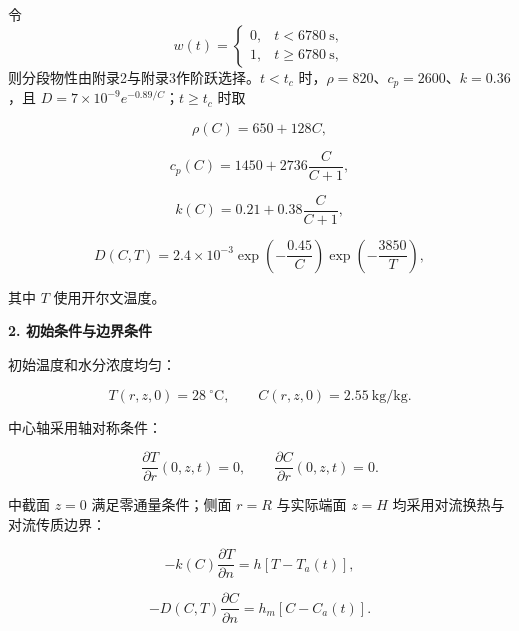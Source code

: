 \documentclass[12pt,a4paper]{ctexart}
\begin{document}
令
\begin{equation}
w(t)=\begin{cases}0,&t<6780\ \mathrm{s},\\1,&t\ge6780\ \mathrm{s},\end{cases}
\label{eq:p3weight}
\end{equation}
则分段物性由附录2与附录3作阶跃选择。$t<t_c$ 时，$\rho=820$、$c_p=2600$、$k=0.36$，且 $D=7\times10^{-9}e^{-0.89/C}$；$t\ge t_c$ 时取

\begin{equation}
\rho(C)=650+128C,
\label{eq:p3rho}
\end{equation}

\begin{equation}
c_p(C)=1450+2736\frac{C}{C+1},
\label{eq:p3cp}
\end{equation}

\begin{equation}
k(C)=0.21+0.38\frac{C}{C+1},
\label{eq:p3k}
\end{equation}

\begin{equation}
D(C,T)=2.4\times10^{-3}
\exp\left(-\frac{0.45}{C}\right)
\exp\left(-\frac{3850}{T}\right),
\label{eq:p3D}
\end{equation}

其中 $T$ 使用开尔文温度。

\textbf{2. 初始条件与边界条件}

初始温度和水分浓度均匀：

\begin{equation}
T(r,z,0)=28\ ^\circ\mathrm{C},\qquad
C(r,z,0)=2.55\ \mathrm{kg/kg}.
\label{eq:p3ic}
\end{equation}

中心轴采用轴对称条件：

\begin{equation}
\frac{\partial T}{\partial r}(0,z,t)=0,\qquad
\frac{\partial C}{\partial r}(0,z,t)=0.
\label{eq:p3axis}
\end{equation}

中截面 $z=0$ 满足零通量条件；侧面 $r=R$ 与实际端面 $z=H$ 均采用对流换热与对流传质边界：

\begin{equation}
-k(C)\frac{\partial T}{\partial n}
=
h\left[T-T_a(t)\right],
\label{eq:p3heatbc}
\end{equation}

\begin{equation}
-D(C,T)\frac{\partial C}{\partial n}
=
h_m\left[C-C_a(t)\right].
\label{eq:p3massbc}
\end{equation}
\end{document}
